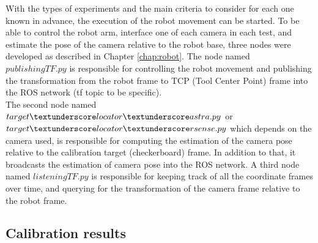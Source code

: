 With the types of experiments and the main criteria to consider for each one known in advance, the execution of the robot movement can be started. To be able to control the robot arm, interface one of each camera in each test, and estimate the pose of the camera relative to the robot base, three nodes were developed as described in Chapter \ref{chap:robot}. The node named $publishingTF.py$ is responsible for controlling the robot movement and publishing the transformation from the robot frame to TCP (Tool Center Point) frame into the ROS network (tf topic to be specific). \\
The second node named $target\textunderscore locator \textunderscore astra.py$ or $target\textunderscore locator \textunderscore rsense.py$  which depends on the camera used, is responsible  for computing the estimation of the camera pose relative to the calibration target (checkerboard) frame. In addition to that, it broadcasts the estimation of camera pose into the ROS network. A third node named $listeningTF.py$ is responsible for keeping track of all the coordinate frames over time, and querying for the transformation of the camera frame relative to the robot frame.

\subsection{Calibration results}

